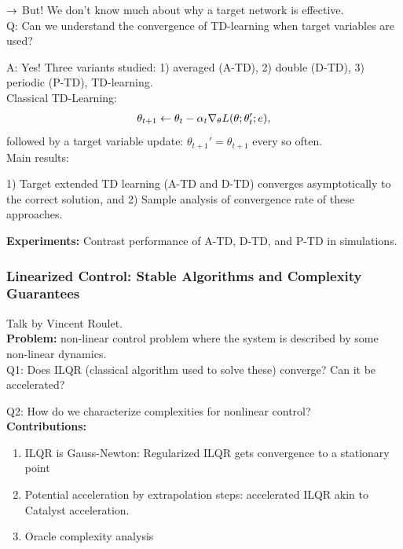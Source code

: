 $\rightarrow$ But! We don't know much about why a target network is effective. \\

Q: Can we understand the convergence of TD-learning when target variables are used?

A: Yes! Three variants studied: 1) averaged (A-TD), 2) double (D-TD), 3) periodic (P-TD), TD-learning. \\

Classical TD-Learning:
\begin{align}
    \theta_{t+1} \leftarrow \theta_t - \alpha_t \nabla_\theta L(\theta;\theta_t';e),
\end{align}
followed by a target variable update: $\theta_{t+1}' = \theta_{t+1}$ every so often. \\

Main results:
\begin{theorem}
1) Target extended TD learning (A-TD and D-TD) converges asymptotically to the correct solution, and 2) Sample analysis of convergence rate of these approaches.
\end{theorem}

{\bf Experiments:} Contrast performance of A-TD, D-TD, and P-TD in simulations. 

\spacerule

\subsubsection{Linearized Control: Stable Algorithms and Complexity Guarantees~\cite{roulet2019iterative}}

Talk by Vincent Roulet. \\

{\bf Problem:} non-linear control problem where the system is described by some non-linear dynamics. \\

Q1: Does ILQR (classical algorithm used to solve these) converge? Can it be accelerated?

Q2: How do we characterize complexities for nonlinear control? \\

{\bf Contributions:}
\begin{enumerate}
    \item ILQR is Gauss-Newton: Regularized ILQR gets convergence to a stationary point
    \item Potential acceleration by extrapolation steps: accelerated ILQR akin to Catalyst acceleration.
    \item Oracle complexity analysis
\end{enumerate}

